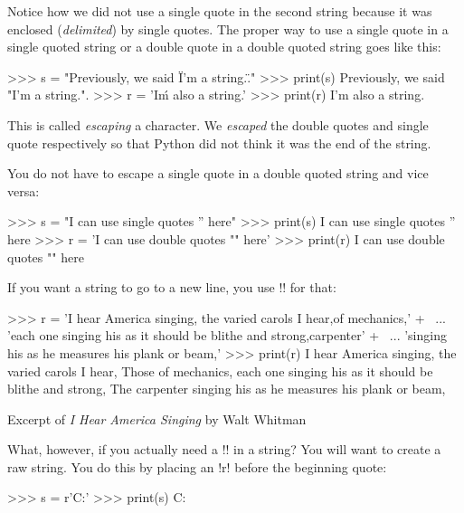 \documentclass[11pt]{cselabheader}
\begin{document}
Notice how we did not use a single quote in the second string because it was
enclosed (\emph{delimited}) by single quotes. The proper way to use a single
quote in a single quoted string or a double quote in a double quoted string
goes like this:

\begin{pyconcode}
>>> s = "Previously, we said \"I'm a string.\"."
>>> print(s)
Previously, we said "I'm a string.".
>>> r = 'I\'m also a string.'
>>> print(r)
I'm also a string.
\end{pyconcode}

This is called \emph{escaping} a character. We \emph{escaped} the double quotes
and single quote respectively so that Python did not think it was the end of
the string.

You do not have to escape a single quote in a double quoted string and vice
versa:

\begin{pyconcode}
>>> s = "I can use single quotes '' here"
>>> print(s)
I can use single quotes '' here
>>> r = 'I can use double quotes "" here'
>>> print(r)
I can use double quotes "" here
\end{pyconcode}

If you want a string to go to a new line, you use \pythoninline!\n! for that:

\begin{listing}[H]
  \vspace{-0.5em}
\begin{pyconcode}
>>> r = 'I hear America singing, the varied carols I hear,\nThose of mechanics,' + \
...     'each one singing his as it should be blithe and strong,\nThe carpenter' + \
...     'singing his as he measures his plank or beam,'
>>> print(r)
I hear America singing, the varied carols I hear,
Those of mechanics, each one singing his as it should be blithe and strong,
The carpenter singing his as he measures his plank or beam,
\end{pyconcode}
  \vspace{-1em}
  \caption{Excerpt of \emph{I Hear America Singing} by Walt Whitman}
  \vspace{-0.5em}
\end{listing}

What, however, if you actually need a \pythoninline!\n! in a string? You will want
to create a raw string. You do this by placing an \pythoninline!r! before the
beginning quote:

\begin{pyconcode}
>>> s = r'C:\Users\Files\nothing\more'
>>> print(s)
C:\Users\Files\nothing\more
\end{pyconcode}
\end{document}
